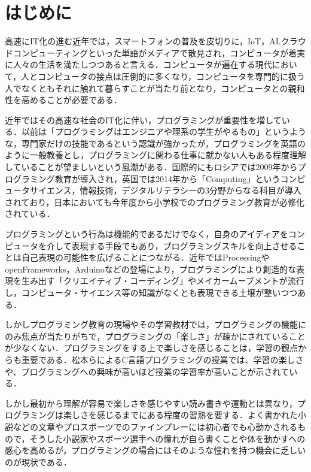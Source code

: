 \section{はじめに}

高速にIT化の進む近年では，スマートフォンの普及を皮切りに，IoT，AI,クラウドコンピューティングといった単語がメディアで散見され，コンピュータが着実に人々の生活を満たしつつあると言える．コンピュータが遍在する現代において，人とコンピュータの接点は圧倒的に多くなり，コンピュータを専門的に扱う人でなくともそれに触れて暮らすことが当たり前となり，コンピュータとの親和性を高めることが必要である．

近年ではその高速な社会のIT化に伴い，プログラミングが重要性を増している．以前は「プログラミングはエンジニアや理系の学生がやるもの」というような，専門家だけの技能であるという認識が強かったが，プログラミングを英語のように一般教養とし，プログラミングに関わる仕事に就かない人もある程度理解していることが望ましいという風潮がある．国際的にもロシアでは2009年からプログラミング教育が導入され，英国では2014年から「Computing」というコンピュータサイエンス，情報技術，デジタルリテラシーの3分野からなる科目が導入されており\cite{survey}，日本においても今年度から小学校でのプログラミング教育が必修化されている\cite{survey}．


プログラミングという行為は機能的であるだけでなく，自身のアイディアをコンピュータを介して表現する手段でもあり，プログラミングスキルを向上させることは自己表現の可能性を広げることにつながる．近年ではProcessingやopenFrameworks，Arduinoなどの登場により，プログラミングにより創造的な表現を生み出す「クリエイティブ・コーディング」やメイカームーブメントが流行し，コンピュータ・サイエンス等の知識がなくとも表現できる土壌が整いつつある．

しかしプログラミング教育の現場やその学習教材では，プログラミングの機能にのみ焦点が当たりがちで，プログラミングの「楽しさ」が疎かにされていることが少なくない．プログラミングをする上で楽しさを感じることは，学習の観点からも重要である．松本らによるC言語プログラミングの授業では、学習の楽しさや、プログラミングへの興味が高いほど授業の学習率が高いことが示されている\cite{matsumoto}．

しかし最初から理解が容易で楽しさを感じやすい読み書きや運動とは異なり，プログラミングは楽しさを感じるまでにある程度の習熟を要する．よく書かれた小説などの文章やプロスポーツでのファインプレーには初心者でも心動かされるもので，そうした小説家やスポーツ選手への憧れが自ら書くことや体を動かすへの感心を高めるが，プログラミングの場合にはそのような憧れを持つ機会に乏しいのが現状である．

